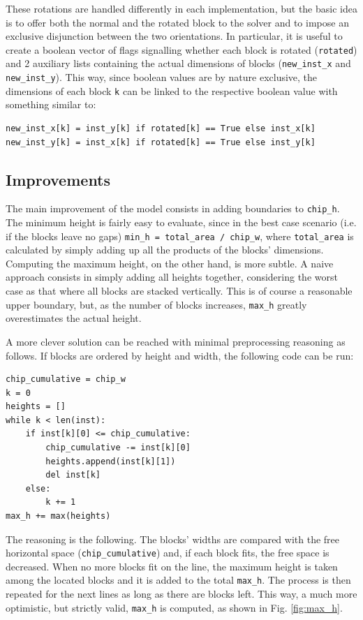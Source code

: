 \documentclass[a4paper, 12pt]{article}
\begin{document}
These rotations are handled differently in each implementation, but the basic idea is to offer both the normal and the rotated block to the solver and to impose an exclusive disjunction between the two orientations. In particular, it is useful to create a boolean vector of flags signalling whether each block is rotated (\verb|rotated|) and 2 auxiliary lists containing the actual dimensions of blocks (\verb|new_inst_x| and \verb|new_inst_y|). This way, since boolean values are by nature exclusive, the dimensions of each block \verb|k| can be linked to the respective boolean value with something similar to:
\begin{verbatim}
new_inst_x[k] = inst_y[k] if rotated[k] == True else inst_x[k]
new_inst_y[k] = inst_x[k] if rotated[k] == True else inst_y[k]
\end{verbatim}



\subsection{Improvements}\label{sec:improvements}

The main improvement of the model consists in adding boundaries to \verb|chip_h|. The minimum height is fairly easy to evaluate, since in the best case scenario (i.e. if the blocks leave no gaps) \verb|min_h = total_area / chip_w|, where \verb|total_area| is calculated by simply adding up all the products of the blocks' dimensions. Computing the maximum height, on the other hand, is more subtle. A naive approach consists in simply adding all heights together, considering the worst case as that where all blocks are stacked vertically. This is of course a reasonable upper boundary, but, as the number of blocks increases, \verb|max_h| greatly overestimates the actual height.

A more clever solution can be reached with minimal preprocessing reasoning as follows. If blocks are ordered by height and width, the following code can be run:
\begin{verbatim}
chip_cumulative = chip_w
k = 0
heights = []
while k < len(inst):
    if inst[k][0] <= chip_cumulative:
        chip_cumulative -= inst[k][0]
        heights.append(inst[k][1])
        del inst[k]
    else:
        k += 1
max_h += max(heights)
\end{verbatim}

The reasoning is the following. The blocks' widths are compared with the free horizontal space (\verb+chip_cumulative+) and, if each block fits, the free space is decreased. When no more blocks fit on the line, the maximum height is taken among the located blocks and it is added to the total \verb|max_h|. The process is then repeated for the next lines as long as there are blocks left. This way, a much more optimistic, but strictly valid, \verb|max_h| is computed, as shown in Fig. \ref{fig:max_h}.
\end{document}
